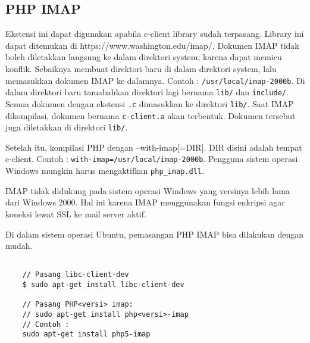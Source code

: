 \subsection{PHP IMAP ~\cite{php-imap}}
Ekstensi ini dapat digunakan apabila c-client library sudah terpasang. Library ini dapat ditemukan di https://www.washington.edu/imap/. Dokumen IMAP tidak boleh diletakkan langsung ke dalam direktori system, karena dapat memicu konflik. Sebaiknya membuat direktori baru di dalam direktori system, lalu memasukkan dokumen IMAP ke dalamnya. Contoh : \texttt{/usr/local/imap-2000b}. Di dalam direktori baru tamabahkan direktori lagi bernama \texttt{lib/} dan \texttt{include/}. Semua dokumen dengan ekstensi \texttt{.c} dimasukkan ke direktori \texttt{lib/}. Saat IMAP dikompilasi, dokumen bernama \texttt{c-client.a} akan terbentuk. Dokumen tersebut juga diletakkan di direktori \texttt{lib/}.

Setelah itu, kompilasi PHP dengan --with-imap[=DIR]. DIR disini adalah tempat c-client. Contoh : \texttt{with-imap=/usr/local/imap-2000b}. Pengguna sistem operasi Windows mungkin harus mengaktifkan \texttt{php\_imap.dll}.

IMAP tidak didukung pada sistem operasi Windows yang versinya lebih lama dari Windows 2000. Hal ini karena IMAP menggunakan fungsi enkripsi agar koneksi lewat SSL ke mail server aktif.

Di dalam sistem operasi Ubuntu, pemasangan PHP IMAP bisa dilakukan dengan mudah.
\begin{lstlisting}
	
	// Pasang libc-client-dev
	$ sudo apt-get install libc-client-dev

	// Pasang PHP<versi> imap:
	// sudo apt-get install php<versi>-imap
	// Contoh : 
	sudo apt-get install php5-imap
		
\end{lstlisting}

